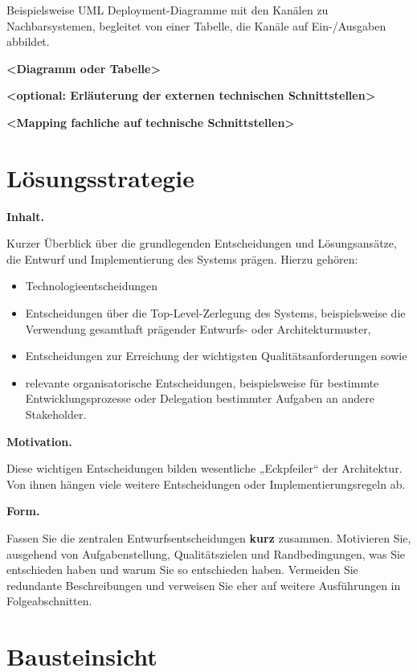 \documentclass[]{article}
\begin{document}
Beispielsweise UML Deployment-Diagramme mit den Kanälen zu
Nachbarsystemen, begleitet von einer Tabelle, die Kanäle auf
Ein-/Ausgaben abbildet.

\textbf{\textless{}Diagramm oder Tabelle\textgreater{}}

\textbf{\textless{}optional: Erläuterung der externen technischen
Schnittstellen\textgreater{}}

\textbf{\textless{}Mapping fachliche auf technische
Schnittstellen\textgreater{}}

\hypertarget{section-solution-strategy}{%
\section{Lösungsstrategie}\label{section-solution-strategy}}

\textbf{Inhalt.}

Kurzer Überblick über die grundlegenden Entscheidungen und
Lösungsansätze, die Entwurf und Implementierung des Systems prägen.
Hierzu gehören:

\begin{itemize}
\item
  Technologieentscheidungen
\item
  Entscheidungen über die Top-Level-Zerlegung des Systems,
  beispielsweise die Verwendung gesamthaft prägender Entwurfs- oder
  Architekturmuster,
\item
  Entscheidungen zur Erreichung der wichtigsten Qualitätsanforderungen
  sowie
\item
  relevante organisatorische Entscheidungen, beispielsweise für
  bestimmte Entwicklungsprozesse oder Delegation bestimmter Aufgaben an
  andere Stakeholder.
\end{itemize}

\textbf{Motivation.}

Diese wichtigen Entscheidungen bilden wesentliche „Eckpfeiler`` der
Architektur. Von ihnen hängen viele weitere Entscheidungen oder
Implementierungsregeln ab.

\textbf{Form.}

Fassen Sie die zentralen Entwurfsentscheidungen \textbf{kurz} zusammen.
Motivieren Sie, ausgehend von Aufgabenstellung, Qualitätszielen und
Randbedingungen, was Sie entschieden haben und warum Sie so entschieden
haben. Vermeiden Sie redundante Beschreibungen und verweisen Sie eher
auf weitere Ausführungen in Folgeabschnitten.

\hypertarget{section-building-block-view}{%
\section{Bausteinsicht}\label{section-building-block-view}}
\end{document}
